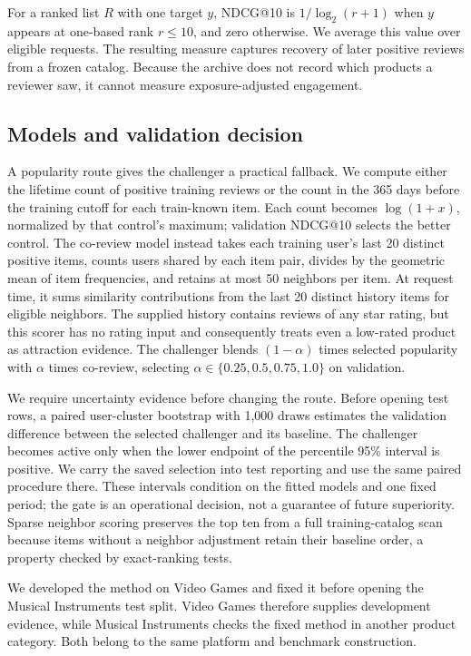 \documentclass[11pt]{article}
\begin{document}
For a ranked list $R$ with one target $y$, NDCG@10 is $1/\log_2(r+1)$ when $y$ appears at one-based rank $r\leq10$, and zero otherwise. We average this value over eligible requests. The resulting measure captures recovery of later positive reviews from a frozen catalog. Because the archive does not record which products a reviewer saw, it cannot measure exposure-adjusted engagement.

\subsection{Models and validation decision}
A popularity route gives the challenger a practical fallback. We compute either the lifetime count of positive training reviews or the count in the 365 days before the training cutoff for each train-known item. Each count becomes $\log(1+x)$, normalized by that control's maximum; validation NDCG@10 selects the better control. The co-review model instead takes each training user's last 20 distinct positive items, counts users shared by each item pair, divides by the geometric mean of item frequencies, and retains at most 50 neighbors per item. At request time, it sums similarity contributions from the last 20 distinct history items for eligible neighbors. The supplied history contains reviews of any star rating, but this scorer has no rating input and consequently treats even a low-rated product as attraction evidence. The challenger blends $(1-\alpha)$ times selected popularity with $\alpha$ times co-review, selecting $\alpha\in\{0.25,0.5,0.75,1.0\}$ on validation.

We require uncertainty evidence before changing the route. Before opening test rows, a paired user-cluster bootstrap with 1,000 draws estimates the validation difference between the selected challenger and its baseline. The challenger becomes active only when the lower endpoint of the percentile 95\% interval is positive. We carry the saved selection into test reporting and use the same paired procedure there. These intervals condition on the fitted models and one fixed period; the gate is an operational decision, not a guarantee of future superiority. Sparse neighbor scoring preserves the top ten from a full training-catalog scan because items without a neighbor adjustment retain their baseline order, a property checked by exact-ranking tests.

We developed the method on Video Games and fixed it before opening the Musical Instruments test split. Video Games therefore supplies development evidence, while Musical Instruments checks the fixed method in another product category. Both belong to the same platform and benchmark construction.
\end{document}
